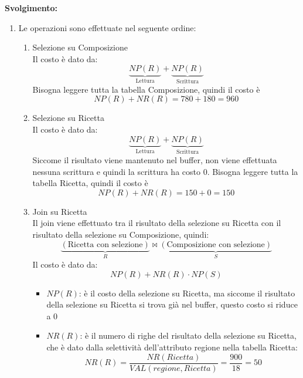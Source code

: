 \documentclass[a4paper]{article}
\begin{document}
\begin{exercise}
  \vspace{1em}
  \noindent
  \textbf{Svolgimento:}
  \begin{enumerate}
    \item Le operazioni sono effettuate nel seguente ordine:
      \begin{enumerate}
        \item Selezione su Composizione\\
          Il costo è dato da:
          \[
            \underbrace{NP(R)}_{\text{Lettura}} + 
            \underbrace{NP(R)}_{\text{Scrittura}}
          \] 
          Bisogna leggere tutta la tabella Composizione, quindi il costo è
          \[
            NP(R) + NR(R) = 780 + 180 = 960
          \] 

        \item Selezione su Ricetta\\
          Il costo è dato da:
          \[
            \underbrace{NP(R)}_{\text{Lettura}} + 
            \underbrace{NP(R)}_{\text{Scrittura}}
          \] 
          Siccome il risultato viene mantenuto nel buffer, non viene effettuata nessuna
          scrittura e quindi la scrittura ha costo 0.
          Bisogna leggere tutta la tabella Ricetta, quindi il costo è
          \[
            NP(R) + NR(R) = 150 + 0 = 150
          \]

        \item Join su Ricetta\\
          Il join viene effettuato tra il risultato della selezione su Ricetta
          con il risultato della selezione su Composizione, quindi:
          \[
            \underbrace{(\text{Ricetta con selezione})}_{R} \bowtie
            \underbrace{(\text{Composizione con selezione})}_{S}
          \] 
          Il costo è dato da:
          \[
            NP(R) + NR(R) \cdot NP(S)
          \] 
          \begin{itemize}
            \item \( NP(R) \): è il costo della selezione su Ricetta, ma siccome il risultato
              della selezione su Ricetta si trova già nel buffer, questo costo si riduce a 0

            \item \( NR(R) \): è il numero di righe del risultato della selezione su Ricetta, che è dato
              dalla selettività dell'attributo regione nella tabella Ricetta:
              \[
                NR(R) = \frac{NR(Ricetta)}{VAL(regione, Ricetta)} = \frac{900}{18} = 50
              \]


\end{itemize}
\end{enumerate}
\end{enumerate}
\end{exercise}
\end{document}
